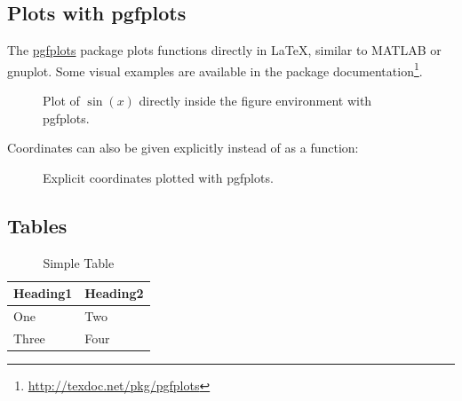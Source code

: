 \subsection{Plots with pgfplots}

The \href{https://ctan.org/pkg/pgfplots}{pgfplots} package plots functions directly in \LaTeX{}, similar to MATLAB or gnuplot.
Some visual examples are available in the package documentation\footnote{\url{http://texdoc.net/pkg/pgfplots}}.

\begin{ltgexample}
\begin{figure}[ht]
  \centering
  \caption{Plot of $\sin(x)$ directly inside the figure environment with pgfplots.}
  \label{fig:pgfplots_example}
\end{figure}
\end{ltgexample}

Coordinates can also be given explicitly instead of as a function:
\begin{ltgexample}
\begin{figure}[ht]
  \centering
  \caption{Explicit coordinates plotted with pgfplots.}
  \label{fig:pgfplots_coords}
\end{figure}
\end{ltgexample}

\subsection{Tables}

\begin{ltgexample}
\begin{table}
  \caption{Simple Table}
  \label{tab:simple}
  \centering
  \begin{tabular}{ll}
    \toprule
    Heading1 & Heading2 \\
    \midrule
    One      & Two      \\
    Three    & Four     \\
    \bottomrule
  \end{tabular}
\end{table}
\end{ltgexample}


